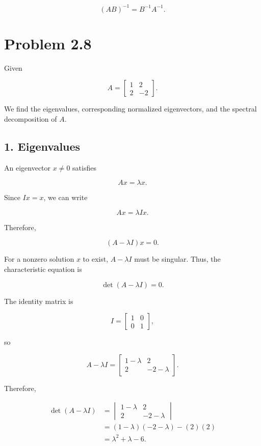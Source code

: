 \documentclass[12pt]{article}
\begin{document}
	\[
	\boxed{(AB)^{-1}=B^{-1}A^{-1}}.
	\]
	
	\section*{Problem 2.8}
	
	Given
	
	\[
	A=
	\begin{bmatrix}
		1&2\\
		2&-2
	\end{bmatrix}.
	\]
	
	We find the eigenvalues, corresponding normalized eigenvectors,
	and the spectral decomposition of $A$.
	
	\subsection*{1. Eigenvalues}
	
	An eigenvector $x\neq0$ satisfies
	
	\[
	Ax=\lambda x.
	\]
	
	Since $Ix=x$, we can write
	
	\[
	Ax=\lambda Ix.
	\]
	
	Therefore,
	
	\[
	(A-\lambda I)x=0.
	\]
	
	For a nonzero solution $x$ to exist, $A-\lambda I$ must be singular.
	Thus, the characteristic equation is
	
	\[
	\det(A-\lambda I)=0.
	\]
	
	The identity matrix is
	
	\[
	I=
	\begin{bmatrix}
		1&0\\
		0&1
	\end{bmatrix},
	\]
	
	so
	
	\[
	A-\lambda I
	=
	\begin{bmatrix}
		1-\lambda&2\\
		2&-2-\lambda
	\end{bmatrix}.
	\]
	
	Therefore,
	
	\[
	\begin{aligned}
		\det(A-\lambda I)
		&=
		\begin{vmatrix}
			1-\lambda&2\\
			2&-2-\lambda
		\end{vmatrix}\\
		&=(1-\lambda)(-2-\lambda)-(2)(2)\\
		&=\lambda^2+\lambda-6.
	\end{aligned}
	\]
	
\end{document}
